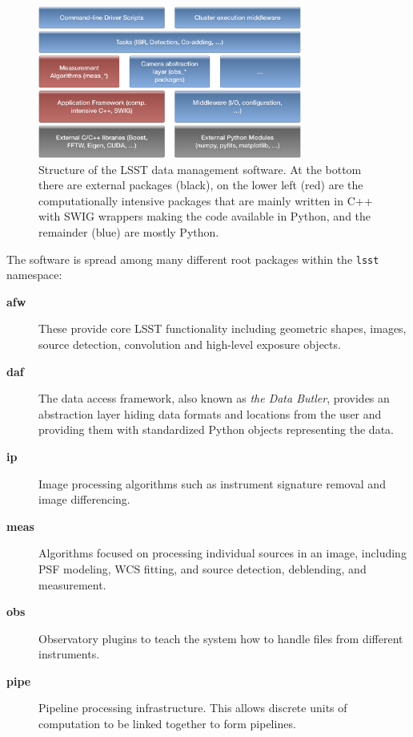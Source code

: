 \documentclass[]{spie}  %
\begin{document}
\begin{figure} [t]
\begin{center}
\includegraphics[height=5cm]{Software-Layers}
\end{center}
\caption[layers]
{\label{fig:layers}
Structure of the LSST data management software.
At the bottom there are external packages (black), on the lower left (red) are the computationally intensive packages that are mainly written in C++ with SWIG wrappers making the code available in Python, and the remainder (blue) are mostly Python.}
\end{figure}

The software is spread among many different root packages within the \texttt{lsst} namespace:

\begin{description}
\item[\textbf{afw}] These provide core LSST functionality including geometric shapes, images, source detection, convolution and high-level exposure objects.

\item[\textbf{daf}] The data access framework, also known as \emph{the Data Butler}, provides an abstraction layer hiding data formats and locations from the user and providing them with standardized Python objects representing the data.

\item[\textbf{ip}] Image processing algorithms such as instrument signature removal and image differencing.

\item[\textbf{meas}] Algorithms focused on processing individual sources in an image, including PSF modeling, WCS fitting, and source detection, deblending, and measurement.

\item[\textbf{obs}] Observatory plugins to teach the system how to handle files from different instruments.

\item[\textbf{pipe}] Pipeline processing infrastructure. This allows discrete units of computation to be linked together to form pipelines.

\end{description}
\end{document}
